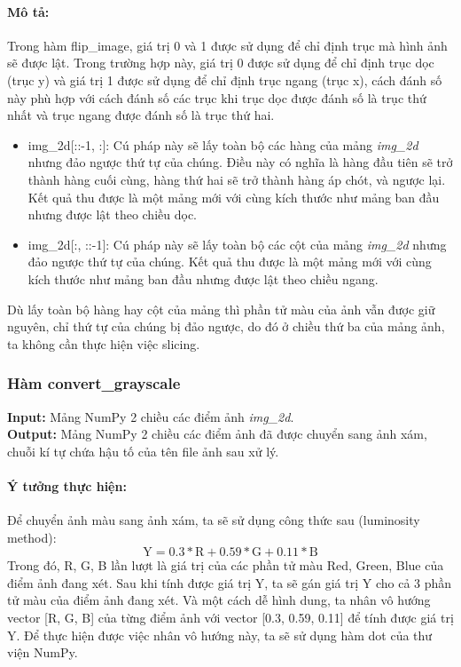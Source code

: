 \documentclass{article}
\begin{document}
\paragraph{Mô tả:} Trong hàm flip\_image, giá trị 0 và 1 được sử dụng để chỉ định trục mà hình ảnh sẽ được lật. Trong trường hợp này, giá trị 0 được sử dụng để chỉ định trục dọc (trục y) và giá trị 1 được sử dụng để chỉ định trục ngang (trục x), cách đánh số này phù hợp với cách đánh số các trục khi trục dọc được đánh số là trục thứ nhất và trục ngang được đánh số là trục thứ hai.
\begin{itemize}
  \item img\_2d[::-1, :]:
  Cú pháp này sẽ lấy toàn bộ các hàng của mảng \textit{img\_2d} nhưng đảo ngược thứ tự của chúng. Điều này có nghĩa là hàng đầu tiên sẽ trở thành hàng cuối cùng, hàng thứ hai sẽ trở thành hàng áp chót, và ngược lại. Kết quả thu được là một mảng mới với cùng kích thước như mảng ban đầu nhưng được lật theo chiều dọc.
  \item img\_2d[:, ::-1]:
  Cú pháp này sẽ lấy toàn bộ các cột của mảng \textit{img\_2d} nhưng đảo ngược thứ tự của chúng. Kết quả thu được là một mảng mới với cùng kích thước như mảng ban đầu nhưng được lật theo chiều ngang.
\end{itemize}
Dù lấy toàn bộ hàng hay cột của mảng thì phần tử màu của ảnh vẫn được giữ nguyên, chỉ thứ tự của chúng bị đảo ngược, do đó ở chiều thứ ba của mảng ảnh, ta không cần thực hiện việc slicing.

\subsubsection{Hàm convert\_grayscale}
\textbf{Input:} Mảng NumPy 2 chiều các điểm ảnh \textit{img\_2d}. \\
\textbf{Output:} Mảng NumPy 2 chiều các điểm ảnh đã được chuyển sang ảnh xám, chuỗi kí tự chứa hậu tố của tên file ảnh sau xử lý.

\paragraph{Ý tưởng thực hiện:} Để chuyển ảnh màu sang ảnh xám, ta sẽ sử dụng công thức sau (luminosity method):
\[ \text{Y} = 0.3*\text{R} + 0.59*\text{G} + 0.11*\text{B}\]
Trong đó, R, G, B lần lượt là giá trị của các phần tử màu Red, Green, Blue của điểm ảnh đang xét. Sau khi tính được giá trị Y, ta sẽ gán giá trị Y cho cả 3 phần tử màu của điểm ảnh đang xét. Và một cách dễ hình dung, ta nhân vô hướng vector [R, G, B] của từng điểm ảnh với vector [0.3, 0.59, 0.11] để tính được giá trị Y. Để thực hiện được việc nhân vô hướng này, ta sẽ sử dụng hàm dot của thư viện NumPy.
\end{document}
